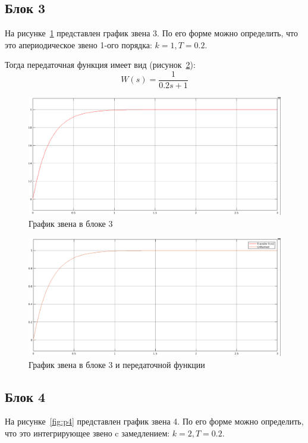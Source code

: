\documentclass[12pt, a4paper] {ncc}
\begin{document}
    \subsection{Блок 3}
		На рисунке~\ref{fig:p3} представлен график звена 3. По его форме можно определить,
		что это апериодическое звено 1-ого порядка: $k = 1, T = 0.2$.
		
		Тогда передаточная функция имеет вид (рисунок~\ref{fig:pb3}):
		\[ W(s) = \dfrac {1} {0.2 s + 1}\]

    	\begin{figure}[ht!]
    		\includegraphics[scale=0.3]{./plot3.png}
			\caption{График звена в блоке 3}
			\label{fig:p3}
    	\end{figure}

    	\begin{figure}[ht!]
    		\includegraphics[scale=0.3]{./plot_both3.png}
			\caption{График звена в блоке 3 и передаточной функции}
			\label{fig:pb3}
    	\end{figure}

    \subsection{Блок 4}

		На рисунке~\ref{fig:p4} представлен график звена 4. По его форме можно определить,
		что это интегрирующее звено c замедлением: $k = 2, T = 0.2$.
		
\end{document}
